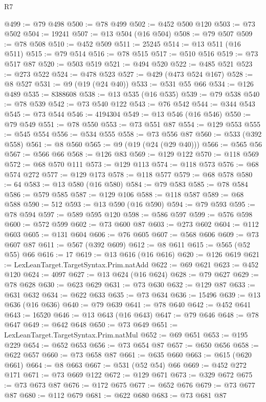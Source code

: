 \begin{lexlean}{R7}
\begin{coremodule}
@499 := @79 @498
@500 := @78 @499
@502 := @452 @500 @120
@503 := @73 @502
@504 := 19241
@507 := @13 @504 (@16 @504)
@508 := @79 @507
@509 := @78 @508
@510 := @452 @509
@511 := 25245
@514 := @13 @511 (@16 @511)
@515 := @79 @514
@516 := @78 @515
@517 := @510 @516
@519 := @73 @517 @87
@520 := @503 @519
@521 := @494 @520
@522 := @485 @521
@523 := @273 @522
@524 := @478 @523
@527 := @429 (@473 @524 @167)
@528 := @8 @527
@531 := @9 (@19 (@24 @40))
@533 := @531 @55 @66
@534 := @126 @489
@535 := 8388608
@538 := @13 @535 (@16 @535)
@539 := @79 @538
@540 := @78 @539
@542 := @73 @540 @122
@543 := @76 @542
@544 := @344 @543
@545 := @73 @544
@546 := 4194304
@549 := @13 @546 (@16 @546)
@550 := @79 @549
@551 := @78 @550
@553 := @73 @551 @87
@554 := @129 @553
@555 := @545 @554
@556 := @534 @555
@558 := @73 @556 @87
@560 := @533 (@392 @558)
@561 := @8 @560
@565 := @9 (@19 (@24 (@29 @40)))
@566 := @565 @56
@567 := @566 @66
@568 := @126 @83
@569 := @129 @122
@570 := @118 @569
@572 := @68 @570 @111
@573 := @129 @113
@574 := @118 @573
@576 := @68 @574 @272
@577 := @129 @173
@578 := @118 @577
@579 := @68 @578
@580 := 64
@583 := @13 @580 (@16 @580)
@584 := @79 @583
@585 := @78 @584
@586 := @579 @585
@587 := @129 @106
@588 := @118 @587
@589 := @68 @588
@590 := 512
@593 := @13 @590 (@16 @590)
@594 := @79 @593
@595 := @78 @594
@597 := @589 @595 @120
@598 := @586 @597
@599 := @576 @598
@600 := @572 @599
@602 := @73 @600 @87
@603 := @273 @602
@604 := @112 @603
@605 := @131 @604
@606 := @76 @605
@607 := @568 @606
@609 := @73 @607 @87
@611 := @567 (@392 @609)
@612 := @8 @611
@615 := @565 (@52 @55) @66
@616 := 17
@619 := @13 @616 (@16 @616)
@620 := @126 @619
@621 := LexLeanTarget.TargetSyntax.Prim.natAdd
@622 := @69 @621
@623 := @452 @120
@624 := 4097
@627 := @13 @624 (@16 @624)
@628 := @79 @627
@629 := @78 @628
@630 := @623 @629
@631 := @73 @630
@632 := @129 @87
@633 := @631 @632
@634 := @622 @633
@635 := @73 @634
@636 := 15496
@639 := @13 @636 (@16 @636)
@640 := @79 @639
@641 := @78 @640
@642 := @452 @641
@643 := 16520
@646 := @13 @643 (@16 @643)
@647 := @79 @646
@648 := @78 @647
@649 := @642 @648
@650 := @73 @649
@651 := LexLeanTarget.TargetSyntax.Prim.natMul
@652 := @69 @651
@653 := @195 @229
@654 := @652 @653
@656 := @73 @654 @87
@657 := @650 @656
@658 := @622 @657
@660 := @73 @658 @87
@661 := @635 @660
@663 := @615 (@620 @661)
@664 := @8 @663
@667 := @531 (@52 @54) @66
@669 := @452 @272 @171
@671 := @73 @669 @122
@672 := @129 @671
@673 := @329 @672
@675 := @73 @673 @87
@676 := @172 @675
@677 := @652 @676
@679 := @73 @677 @87
@680 := @112 @679
@681 := @622 @680
@683 := @73 @681 @87

\end{coremodule}
\end{lexlean}
